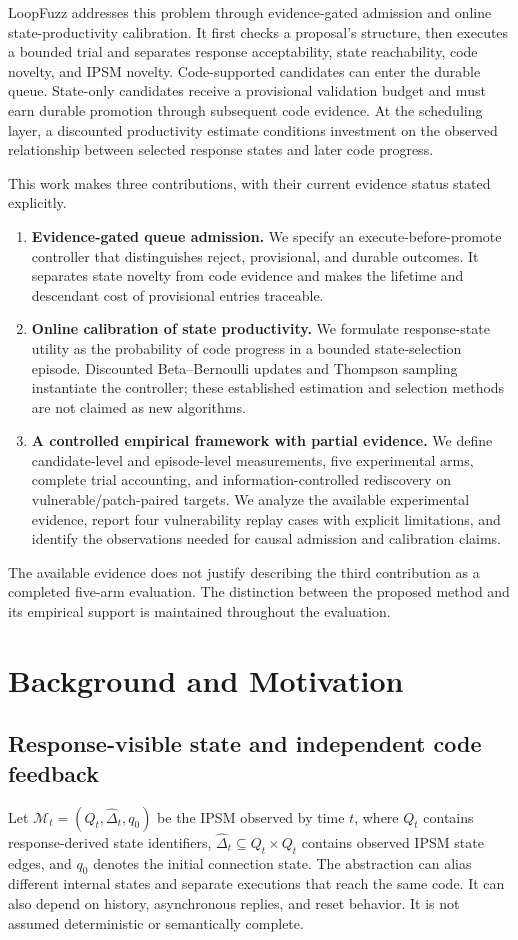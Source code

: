 \documentclass[final,5p,times,number]{elsarticle}
\begin{document}
LoopFuzz addresses this problem through evidence-gated admission and online state-productivity calibration. It first checks a proposal's structure, then executes a bounded trial and separates response acceptability, state reachability, code novelty, and IPSM novelty. Code-supported candidates can enter the durable queue. State-only candidates receive a provisional validation budget and must earn durable promotion through subsequent code evidence. At the scheduling layer, a discounted productivity estimate conditions investment on the observed relationship between selected response states and later code progress.

This work makes three contributions, with their current evidence status stated explicitly.
\begin{enumerate}
\item \textbf{Evidence-gated queue admission.} We specify an execute-before-promote controller that distinguishes reject, provisional, and durable outcomes. It separates state novelty from code evidence and makes the lifetime and descendant cost of provisional entries traceable.
\item \textbf{Online calibration of state productivity.} We formulate response-state utility as the probability of code progress in a bounded state-selection episode. Discounted Beta--Bernoulli updates and Thompson sampling instantiate the controller; these established estimation and selection methods are not claimed as new algorithms.
\item \textbf{A controlled empirical framework with partial evidence.} We define candidate-level and episode-level measurements, five experimental arms, complete trial accounting, and information-controlled rediscovery on vulnerable/patch-paired targets. We analyze the available experimental evidence, report four vulnerability replay cases with explicit limitations, and identify the observations needed for causal admission and calibration claims.
\end{enumerate}
The available evidence does not justify describing the third contribution as a completed five-arm evaluation. The distinction between the proposed method and its empirical support is maintained throughout the evaluation.

\section{Background and Motivation}
\label{sec:motivation}
\subsection{Response-visible state and independent code feedback}
Let $\mathcal{M}_t=(Q_t,\widehat{\Delta}_t,q_0)$ be the IPSM observed by time $t$, where $Q_t$ contains response-derived state identifiers, $\widehat{\Delta}_t\subseteq Q_t\times Q_t$ contains observed IPSM state edges, and $q_0$ denotes the initial connection state. The abstraction can alias different internal states and separate executions that reach the same code. It can also depend on history, asynchronous replies, and reset behavior. It is not assumed deterministic or semantically complete.
\end{document}
